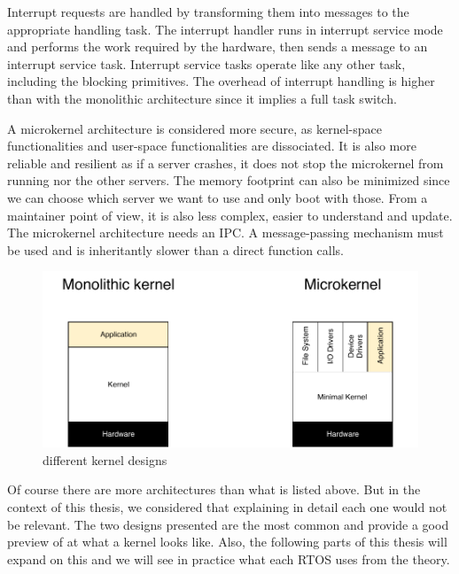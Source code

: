 Interrupt requests are handled by transforming them into messages to the appropriate handling task.
The interrupt handler runs in interrupt service mode and performs the work required by the hardware, then sends a message to an interrupt service task.
Interrupt service tasks operate like any other task, including the blocking primitives.
The overhead of interrupt handling is higher than with the monolithic architecture since it implies a full task switch.

A microkernel architecture is considered more secure, as kernel-space functionalities and user-space functionalities are dissociated.
It is also more reliable and resilient as if a server crashes, it does not stop the microkernel from running nor the other servers.
The memory footprint can also be minimized since we can choose which server we want to use and only boot with those.
From a maintainer point of view, it is also less complex, easier to understand and update.
The microkernel architecture needs an IPC.
A message-passing mechanism must be used and is inheritantly slower than a direct function calls.
\\
\begin{figure}[!h]
    \centering
    \includegraphics[scale=0.8]{assets/kernel_types.pdf}
    \caption{\label{fig:kernel-types}different kernel designs}
\end{figure}

Of course there are more architectures than what is listed above.
But in the context of this thesis, we considered that explaining in detail each one would not be relevant.
The two designs presented are the most common and provide a good preview of at what a kernel looks like.
Also, the following parts of this thesis will expand on this
    and we will see in practice what each RTOS uses from the theory.
